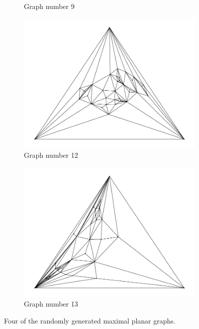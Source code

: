 \documentclass[12pt]{article}
\begin{document}
\begin{figure}[H]
\begin{subfigure}[b]{0.45\textwidth}
          \caption{Graph number 9}
      \end{subfigure}
      \hfill
      \begin{subfigure}[b]{0.45\textwidth}
          \centering 
          \includegraphics[width = \textwidth]{../output/Q9-random-4012.pdf}
          \caption{Graph number 12}
      \end{subfigure}
      \hfill
      \begin{subfigure}[b]{0.45\textwidth}
          \centering 
          \includegraphics[width = \textwidth]{../output/Q9-random-4013.pdf}
          \caption{Graph number 13}
      \end{subfigure}
      \hfill
      \caption{Four of the randomly generated maximal planar graphs.}
  \end{figure}
\end{document}
